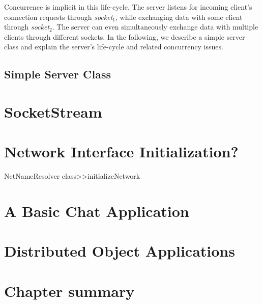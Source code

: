 \documentclass[a4paper,10pt,twoside]{book}
\begin{document}
Concurrence is implicit in this life-cycle.
The server listens for incoming client's connection requests through {\em socket$_1$}, while exchanging data with some client through {\em socket$_2$}.
The server can even simultaneously exchange data with multiple clients through different sockets.
In the following, we describe a simple server class and explain the server's life-cycle and related concurrency issues.

\subsection{Simple Server Class}


\section{SocketStream}
\section{Network Interface Initialization?}
NetNameResolver class>>initializeNetwork
\section{A Basic Chat Application}
\section{Distributed Object Applications}
\section{Chapter summary}



\ifx\wholebook\relax\else
\end{document}

